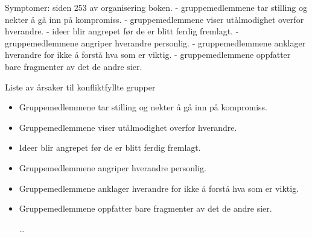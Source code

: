 Symptomer: siden 253 av organisering boken. 
- gruppemedlemmene tar stilling og nekter å gå inn på kompromiss.
- gruppemedlemmene viser utålmodighet overfor hverandre.
- ideer blir angrepet før de er blitt ferdig fremlagt.
- gruppemedlemmene angriper hverandre personlig.
- gruppemedlemmene anklager hverandre for ikke å forstå hva som er viktig.
- gruppemedlemmene oppfatter bare fragmenter av det de andre sier.  



Liste av årsaker til konfliktfyllte grupper\cite[p.~253]{orgorg}

\begin{itemize}

  \item Gruppemedlemmene tar stilling og nekter å gå inn på kompromiss.
  \item Gruppemedlemmene viser utålmodighet overfor hverandre.  
  \item Ideer blir angrepet før de er blitt ferdig fremlagt.
  \item Gruppemedlemmene angriper hverandre personlig.
  \item Gruppemedlemmene anklager hverandre for ikke å forstå hva som er viktig.
  \item Gruppemedlemmene oppfatter bare fragmenter av det de andre sier.  

\ldots
\end{itemize}